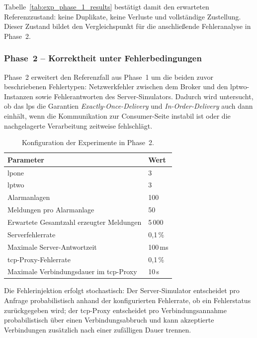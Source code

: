 Tabelle~\ref{tab:exp_phase_1_results} bestätigt damit den erwarteten Referenzzustand: keine Duplikate, keine Verluste und vollständige Zustellung. Dieser Zustand bildet den Vergleichspunkt für die anschließende Fehleranalyse in Phase~2.

\subsubsection{Phase~2 -- Korrektheit unter Fehlerbedingungen}
\label{sub-sub-sec:phase-2}

Phase~2 erweitert den Referenzfall aus Phase~1 um die beiden zuvor beschriebenen Fehlertypen: Netzwerkfehler zwischen dem Broker und den \gls{lptwo}-Instanzen sowie Fehlerantworten des Server-Simulators. Dadurch wird untersucht, ob das \gls{lps} die Garantien \textit{Exactly-Once-Delivery} und \textit{In-Order-Delivery} auch dann einhält, wenn die Kommunikation zur Consumer-Seite instabil ist oder die nachgelagerte Verarbeitung zeitweise fehlschlägt.

\begin{table}[H]
    \centering
    \caption{Konfiguration der Experimente in Phase~2.}
    \label{tab:exp_phase_2_config}
    \begin{tabular}{ll}
        \hline
        Parameter                                    & Wert      \\
        \hline
        \gls{lpone}                                  & 3         \\
        \gls{lptwo}                                  & 3         \\
        Alarmanlagen                                 & 100       \\
        Meldungen pro Alarmanlage                    & 50        \\
        Erwartete Gesamtzahl erzeugter Meldungen     & 5\,000    \\
        Serverfehlerrate                             & 0{,}1\,\% \\
        Maximale Server-Antwortzeit                  & 100\,ms   \\
        \gls{tcp}-Proxy-Fehlerrate                   & 0{,}1\,\% \\
        Maximale Verbindungsdauer im \gls{tcp}-Proxy & 10\,s     \\
        \hline
    \end{tabular}
\end{table}

Die Fehlerinjektion erfolgt stochastisch: Der Server-Simulator entscheidet pro Anfrage probabilistisch anhand der konfigurierten Fehlerrate, ob ein Fehlerstatus zurückgegeben wird; der \gls{tcp}-Proxy entscheidet pro Verbindungsannahme probabilistisch über einen Verbindungsabbruch und kann akzeptierte Verbindungen zusätzlich nach einer zufälligen Dauer trennen.

